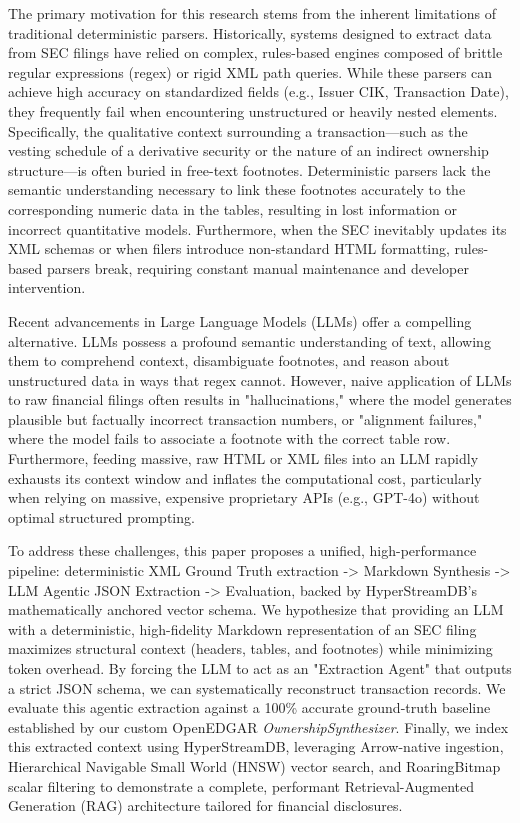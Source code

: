 \documentclass[journal, onecolumn]{IEEEtran}
\begin{document}
The primary motivation for this research stems from the inherent limitations of traditional deterministic parsers. Historically, systems designed to extract data from SEC filings have relied on complex, rules-based engines composed of brittle regular expressions (regex) or rigid XML path queries. While these parsers can achieve high accuracy on standardized fields (e.g., Issuer CIK, Transaction Date), they frequently fail when encountering unstructured or heavily nested elements. Specifically, the qualitative context surrounding a transaction—such as the vesting schedule of a derivative security or the nature of an indirect ownership structure—is often buried in free-text footnotes. Deterministic parsers lack the semantic understanding necessary to link these footnotes accurately to the corresponding numeric data in the tables, resulting in lost information or incorrect quantitative models. Furthermore, when the SEC inevitably updates its XML schemas or when filers introduce non-standard HTML formatting, rules-based parsers break, requiring constant manual maintenance and developer intervention.

Recent advancements in Large Language Models (LLMs) offer a compelling alternative. LLMs possess a profound semantic understanding of text, allowing them to comprehend context, disambiguate footnotes, and reason about unstructured data in ways that regex cannot. However, naive application of LLMs to raw financial filings often results in "hallucinations," where the model generates plausible but factually incorrect transaction numbers, or "alignment failures," where the model fails to associate a footnote with the correct table row. Furthermore, feeding massive, raw HTML or XML files into an LLM rapidly exhausts its context window and inflates the computational cost, particularly when relying on massive, expensive proprietary APIs (e.g., GPT-4o) without optimal structured prompting.

To address these challenges, this paper proposes a unified, high-performance pipeline: deterministic XML Ground Truth extraction -> Markdown Synthesis -> LLM Agentic JSON Extraction -> Evaluation, backed by HyperStreamDB's mathematically anchored vector schema. We hypothesize that providing an LLM with a deterministic, high-fidelity Markdown representation of an SEC filing maximizes structural context (headers, tables, and footnotes) while minimizing token overhead. By forcing the LLM to act as an "Extraction Agent" that outputs a strict JSON schema, we can systematically reconstruct transaction records. We evaluate this agentic extraction against a 100\% accurate ground-truth baseline established by our custom OpenEDGAR \textit{OwnershipSynthesizer}. Finally, we index this extracted context using HyperStreamDB, leveraging Arrow-native ingestion, Hierarchical Navigable Small World (HNSW) vector search, and RoaringBitmap scalar filtering to demonstrate a complete, performant Retrieval-Augmented Generation (RAG) architecture tailored for financial disclosures.
\end{document}

